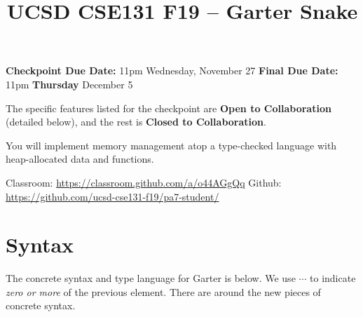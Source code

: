 \documentclass[10pt, oneside]{article}
\title{UCSD CSE131 F19 -- Garter Snake}
\begin{document}
\maketitle 

{\bf Checkpoint Due Date:} 11pm Wednesday, November 27 \hspace{2em} {\bf Final Due Date:} 11pm {\bf Thursday} December 5

The specific features listed for the checkpoint are {\bf Open to
Collaboration} (detailed below), and the rest is {\bf Closed to
Collaboration}.

You will implement memory management atop a type-checked language with
heap-allocated data and functions.

Classroom: \url{https://classroom.github.com/a/o44AGgQq} \hspace{1em} Github: \url{https://github.com/ucsd-cse131-f19/pa7-student/}

\section*{Syntax}

The concrete syntax and type language for Garter is below. We use $\cdots$ to
indicate \textit{zero or more} of the previous element. There are
 around the new pieces of concrete syntax.
\end{document}

